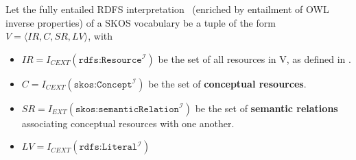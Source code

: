 \begin{definition} Let the fully entailed RDFS interpretation~\cite{RDFSEM2012} (enriched by entailment of OWL inverse properties) of a SKOS vocabulary be a tuple of the form $V = \langle IR, C, SR, LV \rangle$, with
    

\begin{itemize}
	\item \(IR = I_{CEXT}(\texttt{rdfs:Resource}^\mathcal{I})\) be the set of all resources in V, as defined in \cite{RDFSEM2012}.

	\item \(C = I_{CEXT}(\texttt{skos:Concept}^\mathcal{I})\) be the set of \textbf{conceptual resources}.



	\item \(SR = I_{EXT}(\texttt{skos:semanticRelation}^\mathcal{I})\) be the set of \textbf{semantic relations} associating conceptual resources with one another.

	\item $LV = I_{CEXT}(\texttt{rdfs:Literal}^\mathcal{I})$

\end{itemize}

\end{definition}


